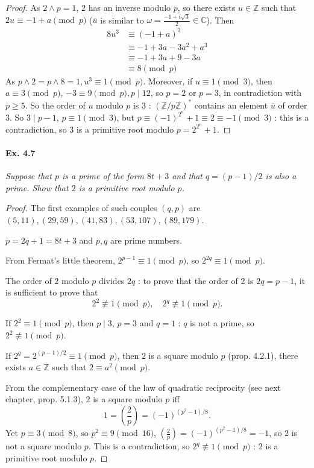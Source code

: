 \documentclass[11pt,a4paper]{article}
\newcommand{\Z}{\mathbb{Z}}
\newcommand{\C}{\mathbb{C}}
\newcommand{\legendre}[2]{\genfrac{(}{)}{}{}{#1}{#2}}
\begin{document}
\begin{proof}
As $2\wedge p = 1$, $2$ has an inverse modulo $p$, so there exists $u \in \Z $ such that $2u \equiv -1+a \pmod p$ ($\overline{u}$ is similar to $\omega = \frac{-1 + i \sqrt{3}}{2} \in \C$). Then
\begin{align*}
8u^3 &\equiv (-1+a)^3\\
&\equiv -1+3a - 3a^2 +a^3\\
&\equiv -1 +3a + 9 -3a\\
&\equiv 8 \pmod p
\end{align*}
As $p\wedge 2 = p \wedge 8 = 1, u^3 \equiv 1 \pmod p$. Moreover, if $u \equiv 1 \pmod 3$, then $a \equiv 3 \pmod p$, $-3 \equiv 9 \pmod p, p\mid 12$, so $p = 2$ or $p=3$, in contradiction with $p\geq 5$. So the order of $u$ modulo $p$ is $3$ : $(\Z/p\Z)^*$ contains an element $\overline{u}$ of order $3$. So $3 \mid p-1$, $p\equiv 1 \pmod 3$, but $p \equiv (-1)^{2^n} + 1 \equiv 2 \equiv -1 \pmod 3$ : this is a contradiction, so $3$ is a primitive root modulo $p = 2^{2^n} +1$.
\end{proof}

\paragraph{Ex. 4.7}

{\it Suppose that $p$ is a prime of the form $8t + 3$ and that $q = (p -1)/2$ is also a prime.  Show that $2$ is a primitive root modulo $p$.
}

\begin{proof}
The first examples of such couples $(q,p)$ are $(5,11), (29,59) ,(41,83) ,(53,107) ,(89,179)$.

$p = 2q+1 = 8t+3$ and $p,q$ are prime numbers.

From Fermat's little theorem, $2^{p-1} \equiv 1 \pmod p$, so $2^{2q} \equiv 1 \pmod p$.

The order of $2$ modulo $p$ divides $2q$ : to prove that the order of $2$ is $2q = p-1$, it is sufficient to prove that
$$2^2 \not \equiv 1 \pmod p, \quad 2^q \not \equiv 1 \pmod p.$$

If $2^2 \equiv 1 \pmod p$, then $p \mid 3$, $p=3$ and $q = 1$ : $q$ is not a prime, so $2^2 \not \equiv 1 \pmod p$.

If $2^q  = 2^{(p-1)/2} \equiv 1 \pmod p$, then $2$ is a square modulo $p$ (prop. 4.2.1), there exists $a \in \Z$ such that $2\equiv a^2 \pmod p$.


From the complementary case of the law of quadratic reciprocity (see next chapter, prop. 5.1.3),  $2$ is a square modulo $p$ iff 
$$1 = \legendre{2}{p} = (-1)^{(p^2-1)/8}.$$
Yet  $p\equiv 3 \pmod 8$, so $p^2 \equiv 9 \pmod {16}$, $\legendre{2}{p} = (-1)^{(p^2-1)/8} = -1$, so $2$ is not a square modulo $p$. This is a contradiction, so $2^q\not \equiv 1 \pmod p$ : $2$ is a primitive root modulo $p$.
\end{proof}
\end{document}
